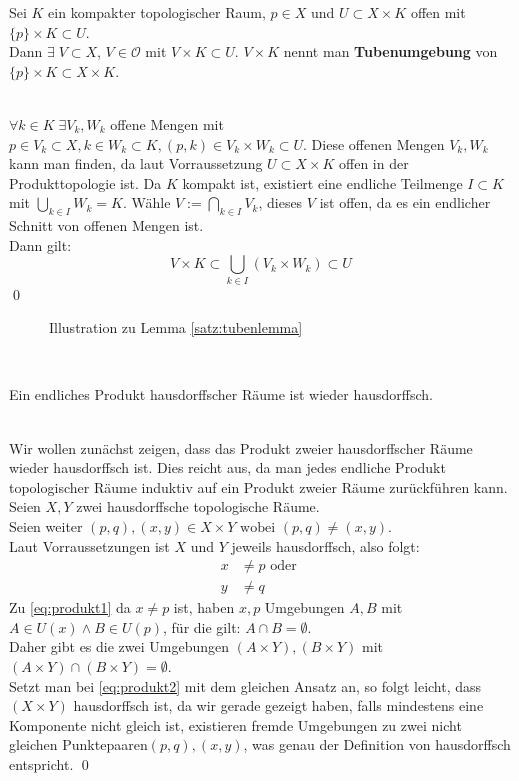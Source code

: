 \begin{Lemma}[Tubenlemma]\label{satz:tubenlemma}
	Sei \(K \) ein kompakter topologischer Raum,  \(p \in X \) und \( U \subset X \times K \) offen mit \( \{p\} \times K \subset U \). \\
	Dann \( \exists \; V \subset X \), \( V \in \mathcal{O} \) mit \( V \times K \subset U \). \( V \times K \) nennt man \textbf{Tubenumgebung} von 
	\( \{p\} \times K \subset X \times K \).
\end{Lemma} 
%
	\\
	\( \forall k \in K \; \exists V_{k}, W_{k}\) offene Mengen mit \( p \in V_{k} \subset X, k \in W_{k} \subset K, (p,k) \in  V_{k} \times W_{k} \subset U\).
	Diese offenen Mengen \(V_{k}, W_{k}\) kann man finden, da laut Vorraussetzung \(U  \subset X \times K \) offen in der Produkttopologie ist.
	Da \(K \) kompakt ist, existiert eine endliche Teilmenge
	\( I \subset K \) mit \( \bigcup_{ k \in I } W_{k} = K \). Wähle \(V := \bigcap_{ k \in I } V_{k} \), dieses \( V\) ist offen, da es ein endlicher Schnitt von offenen Mengen ist.\\
	Dann gilt:
	\[ V \times K \subset \bigcup_{k \in I} (V_{k} \times W_{k}) \subset U \] \qed \newpage	
%
\begin{figure}[ht]
	\centering
	\def\svgwidth{200}
	
	\label{fig:tubenlemma}
	\caption{Illustration zu Lemma \ref{satz:tubenlemma}}
\end{figure}\\
%
\begin{Satz}
	Ein endliches Produkt hausdorffscher Räume ist wieder hausdorffsch.
\end{Satz}
%
	\\
	Wir wollen zunächst zeigen, dass das Produkt zweier hausdorffscher Räume wieder hausdorffsch ist. Dies reicht aus, da man jedes endliche Produkt topologischer Räume
	induktiv auf ein Produkt zweier Räume zurückführen kann. \\
	Seien \(X, Y\) zwei hausdorffsche topologische Räume.\\
	Seien weiter \( (p,q), (x,y) \in X \times Y \mbox{ wobei } (p,q) \ne (x,y) \). \\
	Laut Vorraussetzungen ist \(X\) und \(Y\) jeweils hausdorffsch, also folgt: 
	\begin{align}
		x &\ne p \mbox{ oder }\label{eq:produkt1}\\ 
		y &\ne q\label{eq:produkt2} 
	\end{align}
	Zu \eqref{eq:produkt1} da \(x \ne p \) ist, haben \(x, p \) Umgebungen \(A, B \) mit \( A \in U(x)  \land B \in U(p) \), für die gilt: \(A \cap B = \emptyset \).\\ Daher gibt es die
	zwei Umgebungen \( (A \times Y), (B \times Y) \) mit \( (A \times Y) \cap (B \times Y) = \emptyset \). \\
	Setzt man bei \eqref{eq:produkt2} mit dem gleichen Ansatz an, so folgt leicht, dass \( (X \times Y) \) hausdorffsch ist, da wir gerade gezeigt haben, falls mindestens eine Komponente
	nicht gleich ist, existieren fremde Umgebungen zu zwei nicht gleichen Punktepaaren\( (p,q), (x,y) \), was genau der Definition von hausdorffsch entspricht.
\qed

